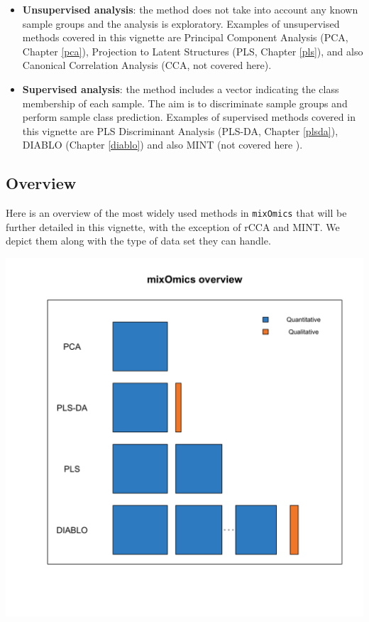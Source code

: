 \documentclass[]{book}
\begin{document}
\begin{itemize}
\item
  \textbf{Unsupervised analysis}: the method does not take into account any known sample groups and the analysis is exploratory. Examples of unsupervised methods covered in this vignette are Principal Component Analysis (PCA, Chapter \ref{pca}), Projection to Latent Structures (PLS, Chapter \ref{pls}), and also Canonical Correlation Analysis (CCA, not covered here).
\item
  \textbf{Supervised analysis}: the method includes a vector indicating the class membership of each sample. The aim is to discriminate sample groups and perform sample class prediction. Examples of supervised methods covered in this vignette are PLS Discriminant Analysis (PLS-DA, Chapter \ref{plsda}), DIABLO (Chapter \ref{diablo}) and also MINT (not covered here \citep{Roh16}).
\end{itemize}

\hypertarget{intro:overview}{%
\subsection{Overview}\label{intro:overview}}

Here is an overview of the most widely used methods in \texttt{mixOmics} that will be further detailed in this vignette, with the exception of rCCA and MINT. We depict them along with the type of data set they can handle.

\begin{center}\includegraphics[width=0.75\linewidth,]{Figures/01-overview-1} \end{center}
\end{document}

